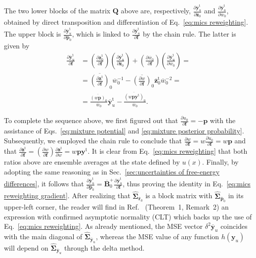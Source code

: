 \documentclass[
    journal=jctcce,
    layout=twocolumn
]{achemso}
\newcommand{\mt}[1]{\boldsymbol{\mathbf{#1}}}   %
\newcommand{\vt}[1]{\boldsymbol{\mathbf{#1}}}   %
\newcommand{\tr}[1]{#1^\text{t}}                %
\newcommand{\diff}[2]{\frac{\partial #2}{\partial #1}} %
\newcommand{\avg}[1]{\overline{#1}}             %
\begin{document}
The two lower blocks of the matrix $\mt Q$ above are, respectively, $\diff{\avg{\vt z}_0}{\tr{\avg{\vt y}}_u}$ and $\diff{\avg{w}_0}{\tr{\avg{\vt y}}_u}$, obtained by direct transposition and differentiation of Eq.~\eqref{eq:mics reweighting}. The upper block is $\diff{\avg{\vt p}_0}{\tr{\avg{\vt y}}_u}$, which is linked to $\diff{\vt f} {\tr{\avg{\vt y}}_u}$ by the chain rule. The latter is given by
\begin{equation*}
\begin{split}
\diff{\vt f}{\tr{\avg{\vt y}}_u} &= \left(\diff{\vt f}{\tr{\avg{\vt z}}_0}\right) \left(\diff{\avg{\vt z}_0} {\tr{\avg{\vt y}}_u}\right) + \left(\diff{\vt f}{{\avg{w}_0}}\right) \left(\diff{\avg{w}_0}{\tr{\avg{\vt y}}_u}\right) = \\
&= {{\avg{\left(\diff{\vt f}{\tr{\vt z}}\right)}_0}}{\avg{w}_0^{-1}} - {\avg{\left(\diff{\vt f}{w}\right)}_0} \tr{\avg{\vt z}}_0  {\avg{w}_0^{-2}} = \\
&= \frac{\avg{(w {\vt p})}_0}{\avg{w}_0} \tr{\avg{\vt y}}_u - \frac{\avg{(w{\vt p}\tr{\vt y})}_0}{\avg{w}_0}.
\end{split}
\end{equation*}

To complete the sequence above, we first figured out that $\diff{\vt f}{u_0} = -{\vt p}$ with the assistance of Eqs.~\eqref{eq:mixture potential} and \eqref{eq:mixture posterior probability}. Subsequently, we employed the chain rule to conclude that $\diff{\vt f}{w} = w \diff{\vt f}{u_0} = w \vt p$ and that $\diff{\vt f}{\tr{\vt z}} = \left(\diff{\vt f}{w}\right) \diff{w}{\tr{\vt z}} = w \vt p \tr{\vt y}$. It is clear from Eq.~\eqref{eq:mics reweighting} that both ratios above are ensemble averages at the state defined by $u(x)$. Finally, by adopting the same reasoning as in Sec.~\ref{sec:uncertainties of free-energy differences}, it follows that $\diff{\avg{\vt p}_0}{\tr{\avg{\vt y}}_u} = \avg{\mt B}_0^+ \diff{\vt f}{\tr{\avg{\vt y}}_u}$, thus proving the identity in Eq.~\eqref{eq:mics reweighting gradient}. After realizing that $\hat{\mt \Sigma}_{\avg{\vt r}_0}$ is a block matrix with $\hat{\mt \Sigma}_{\avg{\vt p}_0}$ in its upper-left corner, the reader will find in Ref.~ (Theorem~1, Remark~2) an expression with confirmed asymptotic normality (CLT) which backs up the use of Eq.~\eqref{eq:mics reweighting}. As already mentioned, the MSE vector $\delta^2 \avg{\vt y}_u$ coincides with the main diagonal of $\hat{\mt \Sigma}_{\avg{\vt y}_u}$, whereas the MSE value of any function $h(\vt y_u)$ will depend on $\hat{\mt \Sigma}_{\avg{\vt y}_u}$ through the delta method.
\end{document}
